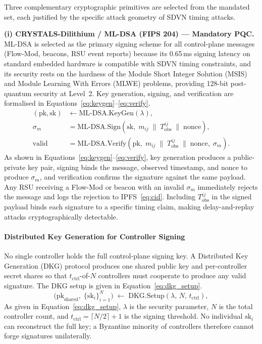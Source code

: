 Three complementary cryptographic primitives are selected from the
mandated set, each justified by the specific attack geometry of SDVN
timing attacks.

\textbf{(i) CRYSTALS-Dilithium / ML-DSA (FIPS 204) — Mandatory PQC.}
ML-DSA is selected as the primary signing scheme for all control-plane
messages (Flow-Mod, beacons, RSU event reports) because its 0.65\,ms
signing latency on standard embedded hardware is compatible with SDVN
timing constraints, and its security rests on the hardness of the
Module Short Integer Solution (MSIS) and Module Learning With Errors
(MLWE) problems, providing 128-bit post-quantum security at Level~2.
Key generation, signing, and verification are formalised in
Equations~\eqref{eq:keygen}--\eqref{eq:verify}.
\begin{align}
(\mathrm{pk},\mathrm{sk})
  &\leftarrow \mathrm{ML\text{-}DSA.KeyGen}(\lambda),
  \label{eq:keygen} \\
\sigma_{m}
  &= \mathrm{ML\text{-}DSA.Sign}\!\left(
      \mathrm{sk},\;
      m_{ij} \;\|\; T_{\mathrm{obs}}^{ij} \;\|\; \mathrm{nonce}
    \right),
  \label{eq:sign} \\
\mathrm{valid}
  &= \mathrm{ML\text{-}DSA.Verify}\!\left(
      \mathrm{pk},\;
      m_{ij} \;\|\; T_{\mathrm{obs}}^{ij} \;\|\; \mathrm{nonce},\;
      \sigma_m
    \right).
  \label{eq:verify}
\end{align}
As shown in Equations~\eqref{eq:keygen}--\eqref{eq:verify},
key generation produces a public-private key pair, signing
binds the message, observed timestamp, and nonce to produce
$\sigma_m$, and verification confirms the signature against
the same payload. Any RSU receiving a Flow-Mod or beacon
with an invalid $\sigma_m$ immediately rejects the message and logs the
rejection to IPFS~\eqref{eq:cid}. Including $T_{\mathrm{obs}}^{ij}$
in the signed payload binds each signature to a specific timing claim,
making delay-and-replay attacks cryptographically detectable.

\paragraph{Distributed Key Generation for Controller Signing}
\label{sec:dkg}

No single controller holds the full control-plane signing key.
A Distributed Key Generation (DKG) protocol produces one shared
public key and per-controller secret shares so that
$t_{\mathrm{ctrl}}$-of-$N$ controllers must cooperate to produce
any valid signature. The DKG setup is given in
Equation~\eqref{eq:dkg_setup}.
%
\begin{equation}
  \bigl(
    \mathrm{pk}_{\mathrm{shared}},\;
    \{\mathrm{sk}_i\}_{i=1}^{N}
  \bigr)
  \;\leftarrow\;
  \mathrm{DKG.Setup}(\lambda,\, N,\, t_{\mathrm{ctrl}}),
  \label{eq:dkg_setup}
\end{equation}
%
As given in Equation~\eqref{eq:dkg_setup}, $\lambda$ is the
security parameter, $N$ is the total controller count, and
$t_{\mathrm{ctrl}} = \lceil N/2 \rceil + 1$ is the signing
threshold. No individual $\mathrm{sk}_i$ can reconstruct the
full key; a Byzantine minority of controllers therefore cannot
forge signatures unilaterally.


